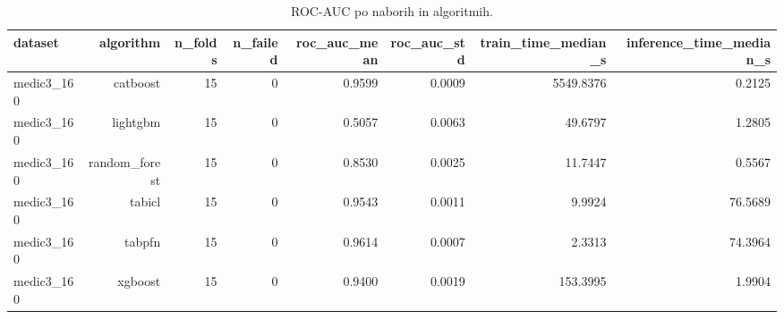 \begin{table}[htbp]
\centering
\caption{ROC-AUC po naborih in algoritmih.}
\label{tab:per-dataset}
\begin{tabular}{lrrrrrrr}
\hline
dataset & algorithm & n\_folds & n\_failed & roc\_auc\_mean & roc\_auc\_std & train\_time\_median\_s & inference\_time\_median\_s \\
\hline
medic3\_160 & catboost & 15 & 0 & 0.9599 & 0.0009 & 5549.8376 & 0.2125 \\
medic3\_160 & lightgbm & 15 & 0 & 0.5057 & 0.0063 & 49.6797 & 1.2805 \\
medic3\_160 & random\_forest & 15 & 0 & 0.8530 & 0.0025 & 11.7447 & 0.5567 \\
medic3\_160 & tabicl & 15 & 0 & 0.9543 & 0.0011 & 9.9924 & 76.5689 \\
medic3\_160 & tabpfn & 15 & 0 & 0.9614 & 0.0007 & 2.3313 & 74.3964 \\
medic3\_160 & xgboost & 15 & 0 & 0.9400 & 0.0019 & 153.3995 & 1.9904 \\
\hline
\end{tabular}
\end{table}

